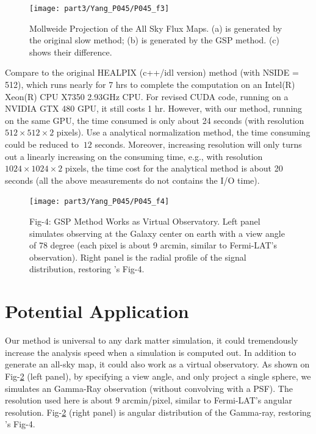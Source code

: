 \begin{figure}[htb]
\begin{center}
 \texttt{[image: part3/Yang\_P045/P045\_f3]}
\caption{Mollweide Projection of the All Sky Flux Maps. (a) is generated by the original slow method; (b) is generated by the GSP method. (c) shows their difference. \label{figcmp}}
\end{center}
\end{figure}

Compare to the original HEALPIX (c++/idl version) method (with NSIDE = 512), which runs nearly for 7 hrs to complete the computation on an Intel(R) Xeon(R) CPU X7350 2.93GHz CPU. For revised CUDA code, running on a NVIDIA GTX 480 GPU, it still costs 1 hr. However, with our method, running on the same GPU, the time consumed is only about 24 seconds (with resolution $512\times512\times2$ pixels). Use a analytical normalization method, the time consuming could be reduced to $~12$ seconds. Moreover, increasing resolution will only turns out a linearly increasing on the consuming time, e.g., with resolution $1024\times1024\times2$ pixels, the time cost for the analytical method is about 20 seconds (all the above measurements do not contains the I/O time). 

\begin{figure}[htb]
\begin{center}
 \texttt{[image: part3/Yang\_P045/P045\_f4]}
\caption{Fig-4: GSP Method Works as Virtual Observatory. Left panel simulates observing at the Galaxy center on earth with a view angle of 78 degree (each pixel is about 9 arcmin, similar to Fermi-LAT’s observation). Right panel is the radial profile of the signal distribution, restoring \citet{Kuhlen:2008kr}'s Fig-4.  \label{figapp}}
\end{center}
\end{figure}

\section{Potential Application}
Our method is universal to any dark matter simulation, it could tremendously increase the analysis speed when a simulation is computed out. In addition to generate an all-sky map, it could also work as a virtual observatory. As shown on Fig-\ref{figapp} (left panel), by specifying a view angle, and only project a single sphere, we simulates an Gamma-Ray observation (without convolving with a PSF). The resolution used here is about $9$ arcmin/pixel, similar to Fermi-LAT's angular resolution. Fig-\ref{figapp} (right panel) is angular distribution of the Gamma-ray, restoring \citet{Kuhlen:2008kr}'s Fig-4. 

